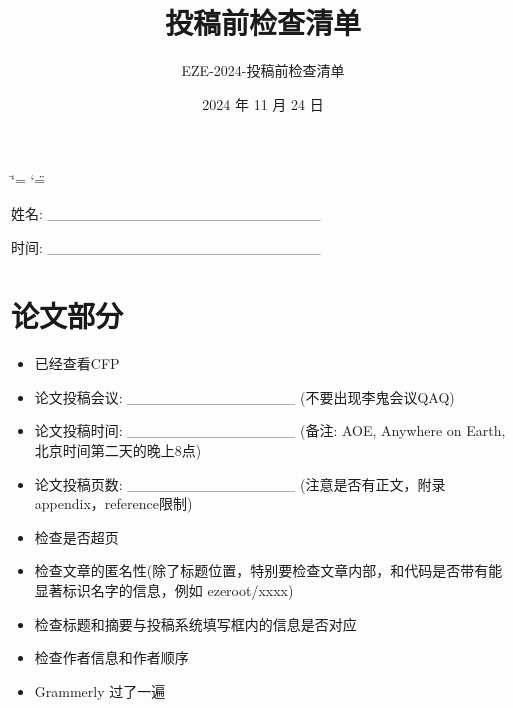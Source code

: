 \documentclass[letterpaper,12pt,english]{sphinxhowto}
\title{投稿前检查清单}
\date{2024 年 11 月 24 日}
\author{EZE-2024-投稿前检查清单}
\begin{document}
\ifdefined\shorthandoff
  \ifnum\catcode`\=\string=\active\shorthandoff{=}\fi
  \ifnum\catcode`\"=\active{}\fi
\fi

\pagestyle{empty}

    \maketitle

\pagestyle{plain}

\pagestyle{normal}
\label{\detokenize{mds/checklist::doc}}


\sphinxAtStartPar
{\hyperref[\detokenize{mds/checklist:./_static/checklist-1.pdf}]{}}

\sphinxAtStartPar
姓名: \_\_\_\_\_\_\_\_\_\_\_\_\_\_\_\_\_\_\_\_\_\_\_\_\_\_

\sphinxAtStartPar
时间: \_\_\_\_\_\_\_\_\_\_\_\_\_\_\_\_\_\_\_\_\_\_\_\_\_\_


\section{论文部分}
\label{\detokenize{mds/checklist:id2}}\begin{itemize}
\item {} 
\sphinxAtStartPar
 已经查看CFP

\item {} 
\sphinxAtStartPar
 论文投稿会议: \_\_\_\_\_\_\_\_\_\_\_\_\_\_\_\_ (不要出现李鬼会议QAQ)

\item {} 
\sphinxAtStartPar
 论文投稿时间: \_\_\_\_\_\_\_\_\_\_\_\_\_\_\_\_ (备注: AOE, Anywhere on Earth, 北京时间第二天的晚上8点)

\item {} 
\sphinxAtStartPar
 论文投稿页数: \_\_\_\_\_\_\_\_\_\_\_\_\_\_\_\_ (注意是否有正文，附录appendix，reference限制)

\item {} 
\sphinxAtStartPar
 检查是否超页

\item {} 
\sphinxAtStartPar
 检查文章的匿名性(除了标题位置，特别要检查文章内部，和代码是否带有能显著标识名字的信息，例如 eze\sphinxhyphen{}root/xxxx)

\item {} 
\sphinxAtStartPar
 检查标题和摘要与投稿系统填写框内的信息是否对应

\item {} 
\sphinxAtStartPar
 检查作者信息和作者顺序

\item {} 
\sphinxAtStartPar
 Grammerly 过了一遍

\end{itemize}
\end{document}
